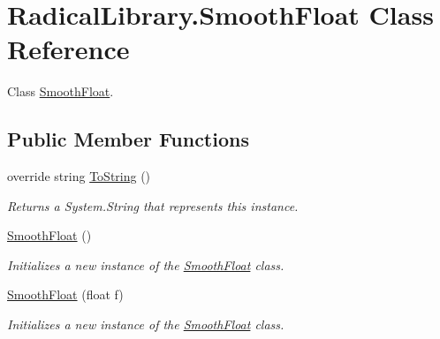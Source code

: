 \hypertarget{class_radical_library_1_1_smooth_float}{}\section{Radical\+Library.\+Smooth\+Float Class Reference}
\label{class_radical_library_1_1_smooth_float}


Class \hyperlink{class_radical_library_1_1_smooth_float}{Smooth\+Float}.  


\subsection*{Public Member Functions}
\begin{DoxyCompactItemize}
\item 
override string \hyperlink{class_radical_library_1_1_smooth_float_aa900ef9074a4ae88ce65a2a562b98433}{To\+String} ()
\begin{DoxyCompactList}\small\item\em Returns a System.\+String that represents this instance. \end{DoxyCompactList}\item 
\hyperlink{class_radical_library_1_1_smooth_float_ac0bbfcb1d44ca2dad37f574156f4075e}{Smooth\+Float} ()
\begin{DoxyCompactList}\small\item\em Initializes a new instance of the \hyperlink{class_radical_library_1_1_smooth_float}{Smooth\+Float} class. \end{DoxyCompactList}\item 
\hyperlink{class_radical_library_1_1_smooth_float_a982a3005f927fe86a7d032bfd794a15c}{Smooth\+Float} (float f)
\begin{DoxyCompactList}\small\item\em Initializes a new instance of the \hyperlink{class_radical_library_1_1_smooth_float}{Smooth\+Float} class. \end{DoxyCompactList}\end{DoxyCompactItemize}
